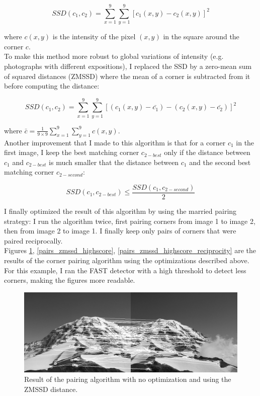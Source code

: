 \documentclass[a4paper,twocolumn]{article}
\begin{document}
$$
SSD(c_1, c_2) = \sum_{x = 1}^{9} \sum_{y = 1}^{9} \left[c_1(x, y) - c_2(x, y)\right]^2
$$

where $c(x,y)$ is the intensity of the pixel $(x,y)$ in the square around the corner $c$.
\\

To make this method more robust to global variations of intensity (e.g. photographs with different expositions), I replaced the SSD by a zero-mean sum of squared distances (ZMSSD) where the mean of a corner is subtracted from it before computing the distance:

$$
SSD(c_1, c_2) = \sum_{x = 1}^{9} \sum_{y = 1}^{9} \left[(c_1(x, y) - \bar{c_1}) - (c_2(x, y) - \bar{c_2})\right]^2
$$

where $\bar{c} = \frac{1}{9\times9} \sum_{x = 1}^{9} \sum_{y = 1}^{9} c(x,y)$.
\\

Another improvement that I made to this algorithm is that for a corner $c_1$ in the first image, I keep the best matching corner $c_{2-best}$ only if the distance between $c_1$ and $c_{2-best}$ is much smaller that the distance between $c_1$ and the second best matching corner $c_{2-second}$:

$$
SSD(c_1, c_{2-best}) \le \frac{SSD(c_1, c_{2-second})}{2}
$$

I finally optimized the result of this algorithm by using the married pairing strategy: I run the algorithm twice, first pairing corners from image 1 to image 2, then from image 2 to image 1. I finally keep only pairs of corners that were paired reciprocally.
\\

Figures \ref{pairs_zmssd}, \ref{pairs_zmssd_highscore}, \ref{pairs_zmssd_highscore_reciprocity} are the results of the corner pairing algorithm using the optimizations described above. For this example, I ran the FAST detector with a high threshold to detect less corners, making the figures more readable.

\begin{figure}[h!]
\vspace{1cm}
\centering\includegraphics[width=\textwidth]{images/pairs_zmssd.png}
\caption{Result of the pairing algorithm with no optimization and using the ZMSSD distance.}
\label{pairs_zmssd}
\end{figure}
\end{document}
